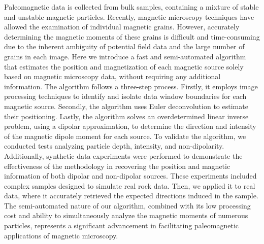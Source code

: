 Paleomagnetic data is collected from bulk samples, containing a mixture of stable and unstable magnetic particles. Recently, magnetic microscopy techniques have allowed the examination of individual magnetic grains. However, accurately determining the magnetic moments of these grains is difficult and time-consuming due to the inherent ambiguity of potential field data and the large number of grains in each image. Here we introduce a fast and semi-automated algorithm that estimates the position and magnetization of each magnetic source solely based on magnetic microscopy data, without requiring any additional information. The algorithm follows a three-step process. Firstly, it employs image processing techniques to identify and isolate data window boundaries for each magnetic source. Secondly, the algorithm uses Euler deconvolution to estimate their positioning. Lastly, the algorithm solves an overdetermined linear inverse problem, using a dipolar approximation, to determine the direction and intensity of the magnetic dipole moment for each source. To validate the algorithm, we conducted tests analyzing particle depth, intensity, and non-dipolarity. Additionally, synthetic data experiments were performed to demonstrate the effectiveness of the methodology in recovering the position and magnetic information of both dipolar and non-dipolar sources. These experiments included complex samples designed to simulate real rock data. Then, we applied it to real data, where it accurately retrieved the expected directions induced in the sample. The semi-automated nature of our algorithm, combined with its low processing cost and ability to simultaneously analyze the magnetic moments of numerous particles, represents a significant advancement in facilitating paleomagnetic applications of magnetic microscopy.